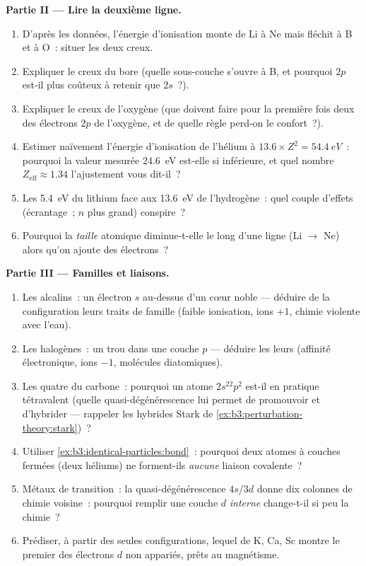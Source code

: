 \begin{problem}
\medskip\noindent\textbf{Partie II --- Lire la deuxième ligne.}
\begin{enumerate}[resume]
  \item D'après les données, l'énergie d'ionisation monte de Li à Ne
        mais fléchit à B et à O~: situer les deux creux.
  \item Expliquer le creux du bore (quelle sous-couche s'ouvre à B, et
        pourquoi $2p$ est-il plus coûteux à retenir que $2s$~?).
  \item Expliquer le creux de l'oxygène (que doivent faire pour la
        première fois deux des électrons $2p$ de l'oxygène, et de
        quelle règle perd-on le confort~?).
  \item Estimer naïvement l'énergie d'ionisation de l'hélium à
        $13.6 \times Z^2 = \qty{54.4}{eV}$~: pourquoi la valeur
        mesurée \qty{24.6}{eV} est-elle si inférieure, et quel nombre
        $Z_{\text{eff}} \approx 1.34$ l'ajustement vous dit-il~?
  \item Les \qty{5.4}{eV} du lithium face aux \qty{13.6}{eV} de
        l'hydrogène~: quel couple d'effets (écrantage~; $n$ plus
        grand) conspire~?
  \item Pourquoi la \emph{taille} atomique diminue-t-elle le long
        d'une ligne (Li $\to$ Ne) alors qu'on ajoute des électrons~?
\end{enumerate}

\medskip\noindent\textbf{Partie III --- Familles et liaisons.}
\begin{enumerate}[resume]
  \item Les alcalins~: un électron $s$ au-dessus d'un cœur noble ---
        déduire de la configuration leurs traits de famille (faible
        ionisation, ions $+1$, chimie violente avec l'eau).
  \item Les halogènes~: un trou dans une couche $p$ --- déduire les
        leurs (affinité électronique, ions $-1$, molécules
        diatomiques).
  \item Les quatre du carbone~: pourquoi un atome $2s^22p^2$ est-il en
        pratique tétravalent (quelle quasi-dégénérescence lui permet
        de promouvoir et d'hybrider --- rappeler les hybrides
        Stark de \cref{ex:b3:perturbation-theory:stark})~?
  \item Utiliser \cref{ex:b3:identical-particles:bond}~: pourquoi deux
        atomes à couches fermées (deux héliums) ne forment-ils
        \emph{aucune} liaison covalente~?
  \item Métaux de transition~: la quasi-dégénérescence $4s$/$3d$ donne
        dix colonnes de chimie voisine~: pourquoi remplir une couche
        $d$ \emph{interne} change-t-il si peu la chimie~?
  \item Prédiser, à partir des seules configurations, lequel de K, Ca,
        Sc montre le premier des électrons $d$ non appariés, prêts au
        magnétisme.
\end{enumerate}


\end{problem}
